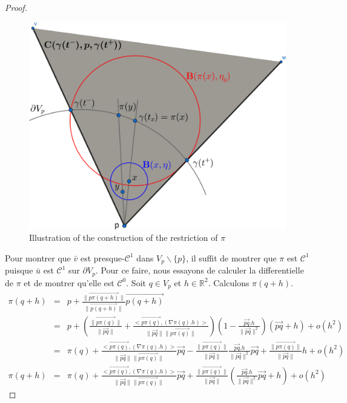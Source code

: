 \begin{proof}
\begin{figure}[!h]
\includegraphics[scale=0.35]{images/v_bar_almost_continuous_++.pdf}
\caption{Illustration of the construction of the restriction of $\pi$}
\label{fig:v_bar_almost_continuous}
\end{figure}

Pour montrer que $\bar{v}$ est presque-$\mathcal{C}^1$ dans $V_p\backslash\{p\}$, il suffit de montrer que $\pi$ est $\mathcal{C}^1$ puisque $\bar{u}$ est $\mathcal{C}^1$ sur $\partial V_p$. Pour ce faire, nous essayons de calculer la differentielle de $\pi$ et de montrer qu'elle est $\mathcal{C}^0$. Soit $q\in V_p$ et $h\in\mathbb{R}^2$. Calculons $\pi(q+h)$.
\begin{eqnarray*}
    \pi(q+h)&=&p+\frac{\|\overrightarrow{p\pi(q+h)}\|}{\|\overrightarrow{p(q+h)}\|}\overrightarrow{p(q+h)}\\[0.2cm]
    &=&p+\left(\frac{\|\overrightarrow{p\pi(q)}\|}{\|\overrightarrow{pq}\|}+\frac{<\overrightarrow{p\pi(q)}, (\nabla\pi(q).h)>}{\|\overrightarrow{pq}\|\|\overrightarrow{p\pi(q)}\|}\right)\left(1-\frac{\overrightarrow{pq}.h}{\|\overrightarrow{pq}\|^2}\right)\left(\overrightarrow{pq}+h\right) + o(h^2)\\[0.2cm]
    &=&\pi(q)+\frac{<\overrightarrow{p\pi(q)}, (\nabla\pi(q).h)>}{\|\overrightarrow{pq}\|\|\overrightarrow{p\pi(q)}\|}\overrightarrow{pq}-\frac{\|\overrightarrow{p\pi(q)}\|}{\|\overrightarrow{pq}\|}\frac{\overrightarrow{pq}.h}{\|\overrightarrow{pq}\|^2}\overrightarrow{pq}+\frac{\|\overrightarrow{p\pi(q)}\|}{\|\overrightarrow{pq}\|}h+o(h^2)\\[0.2cm]
    \pi(q+h)&=&\pi(q)+\frac{<\overrightarrow{p\pi(q)}, (\nabla\pi(q).h)>}{\|\overrightarrow{pq}\|\|\overrightarrow{p\pi(q)}\|}\overrightarrow{pq}+\frac{\|\overrightarrow{p\pi(q)}\|}{\|\overrightarrow{pq}\|}\left(\frac{\overrightarrow{pq}.h}{\|\overrightarrow{pq}\|^2}\overrightarrow{pq}+h\right)+o(h^2)
\end{eqnarray*}


\end{proof}
